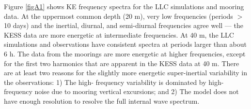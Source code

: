 \documentclass[draft,grl]{agutexSI}
\begin{document}
\begin{article}
Figure \ref{figA1} shows KE frequency spectra for the LLC simulations and mooring data.
At the uppermost common depth (20 m), very low frequencies (periods $>$ 10 days)
and the inertial, diurnal, and semi-diurnal frequencies agree well --- the KESS
data are more energetic at intermediate frequencies. At 40 m, the LLC simulations and observations
have consistent spectra at periods larger than about 6 h. The data from the moorings
are more energetic at higher frequencies,
except for the first two harmonics that are apparent in the KESS data at 40 m.
There are at least two reasons for the slightly more energetic super-inertial
variability in the observations: 1) The high-
frequency variability is dominated by high-frequency noise due to mooring vertical
excursions; and 2) The model does not have enough resolution to resolve the full internal
wave spectrum.







%
%



\end{article}
\end{document}
